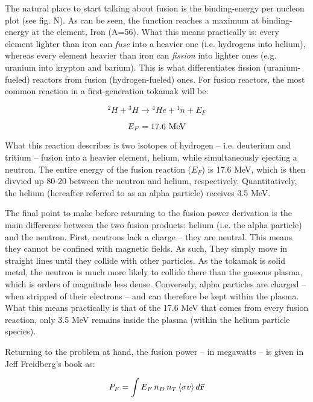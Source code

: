 \documentclass[11pt]{book}
\begin{document}
The natural place to start talking about fusion is the binding-energy per nucleon plot (see fig. N). As can be seen, the function reaches a maximum at binding-energy at the element, Iron (A=56). What this means practically is: every element lighter than iron can \emph{fuse} into a heavier one (i.e. hydrogens into helium), whereas every element heavier than iron can \emph{fission} into lighter ones (e.g. uranium into krypton and barium). This is what differentiates fission (uranium-fueled) reactors from fusion (hydrogen-fueled) ones. For fusion reactors, the most common reaction in a first-generation tokamak will be:

\begin{equation}
	{}^2H+ {}^3H \rightarrow {}^4 He + {}^1 n + E_F
\end{equation}

\begin{equation}
	E_F = 17.6 \ \textnormal{MeV}
\end{equation}

What this reaction describes is two isotopes of hydrogen -- i.e. deuterium and tritium -- fusion into a heavier element, helium, while simultaneously ejecting a neutron. The entire energy of the fusion reaction ($E_F$) is 17.6 MeV, which is then divvied up 80-20 between the neutron and helium, respectively. Quantitatively, the helium (hereafter referred to as an alpha particle) receives 3.5 MeV.

The final point to make before returning to the fusion power derivation is the main difference between the two fusion products: helium (i.e. the alpha particle) and the neutron. First, neutrons lack a charge -- they are neutral. This means they cannot be confined with magnetic fields. As such, They simply move in straight lines until they collide with other particles. As the tokamak is solid metal, the neutron is much more likely to collide there than the gaseous plasma, which is orders of magnitude less dense. Conversely, alpha particles are charged -- when stripped of their electrons -- and can therefore be kept within the plasma. What this means practically is that of the 17.6 MeV that comes from every fusion reaction, only 3.5 MeV remains inside the plasma (within the helium particle species).
 
 Returning to the problem at hand, the fusion power -- in megawatts -- is given in Jeff Freidberg's book as:
 
 \begin{equation}
 	\label{eq:pf_int}
 	P_F = \int E_F \, n_D \, n_T \, \langle \sigma v \rangle \, d \vec{\bold{r}}
 \end{equation}
 
\end{document}
